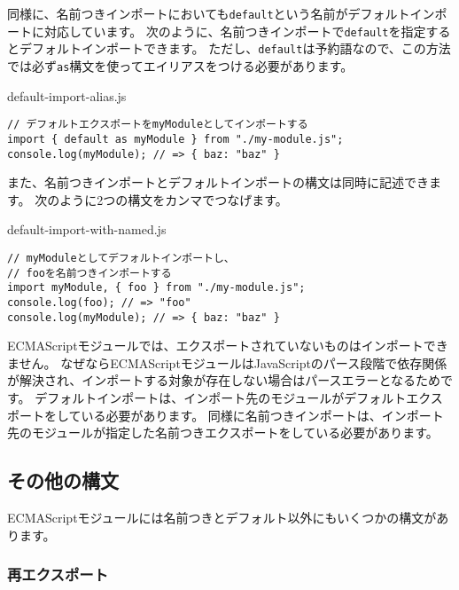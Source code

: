 同様に、名前つきインポートにおいても\texttt{default}という名前がデフォルトインポートに対応しています。
次のように、名前つきインポートで\texttt{default}を指定するとデフォルトインポートできます。
ただし、\texttt{default}は予約語なので、この方法では必ず\texttt{as}構文を使ってエイリアスをつける必要があります。

\begin{listtitle}
default-import-alias.js
\end{listtitle}
\begin{lstlisting}
// デフォルトエクスポートをmyModuleとしてインポートする
import { default as myModule } from "./my-module.js";
console.log(myModule); // => { baz: "baz" }
\end{lstlisting}
\listend

また、名前つきインポートとデフォルトインポートの構文は同時に記述できます。
次のように2つの構文をカンマでつなげます。

\begin{listtitle}
default-import-with-named.js
\end{listtitle}
\begin{lstlisting}
// myModuleとしてデフォルトインポートし、
// fooを名前つきインポートする
import myModule, { foo } from "./my-module.js";
console.log(foo); // => "foo"
console.log(myModule); // => { baz: "baz" }
\end{lstlisting}
\listend

ECMAScriptモジュールでは、エクスポートされていないものはインポートできません。
なぜならECMAScriptモジュールはJavaScriptのパース段階で依存関係が解決され、インポートする対象が存在しない場合はパースエラーとなるためです。
デフォルトインポートは、インポート先のモジュールがデフォルトエクスポートをしている必要があります。
同様に名前つきインポートは、インポート先のモジュールが指定した名前つきエクスポートをしている必要があります。

\hypertarget{other-syntax}{%
\subsection{その他の構文}\label{other-syntax}}

ECMAScriptモジュールには名前つきとデフォルト以外にもいくつかの構文があります。

\hypertarget{re-export}{%
\subsubsection{再エクスポート}\label{re-export}}


